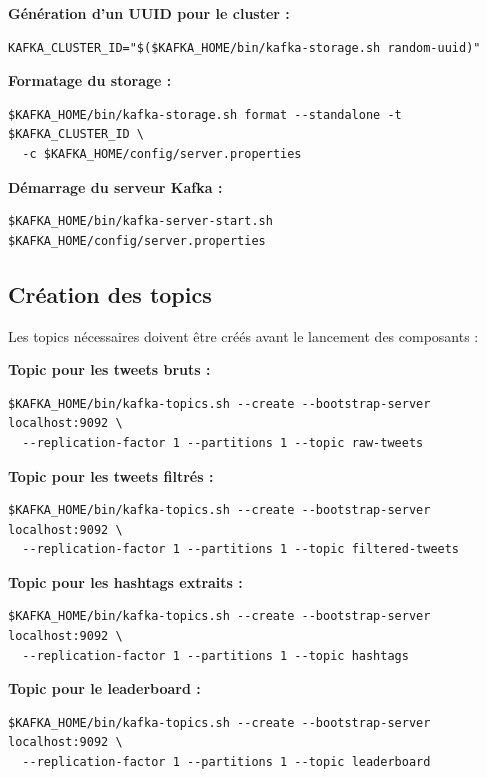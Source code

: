 \documentclass[10pt,a4paper]{article}
\begin{document}
\textbf{Génération d'un UUID pour le cluster :}

\begin{verbatim}
KAFKA_CLUSTER_ID="$($KAFKA_HOME/bin/kafka-storage.sh random-uuid)"
\end{verbatim}

\textbf{Formatage du storage :}

\begin{verbatim}
$KAFKA_HOME/bin/kafka-storage.sh format --standalone -t $KAFKA_CLUSTER_ID \
  -c $KAFKA_HOME/config/server.properties
\end{verbatim}

\textbf{Démarrage du serveur Kafka :}

\begin{verbatim}
$KAFKA_HOME/bin/kafka-server-start.sh $KAFKA_HOME/config/server.properties
\end{verbatim}

\subsection{Création des topics}

Les topics nécessaires doivent être créés avant le lancement des composants :

\textbf{Topic pour les tweets bruts :}

\begin{verbatim}
$KAFKA_HOME/bin/kafka-topics.sh --create --bootstrap-server localhost:9092 \
  --replication-factor 1 --partitions 1 --topic raw-tweets
\end{verbatim}

\textbf{Topic pour les tweets filtrés :}

\begin{verbatim}
$KAFKA_HOME/bin/kafka-topics.sh --create --bootstrap-server localhost:9092 \
  --replication-factor 1 --partitions 1 --topic filtered-tweets
\end{verbatim}

\textbf{Topic pour les hashtags extraits :}

\begin{verbatim}
$KAFKA_HOME/bin/kafka-topics.sh --create --bootstrap-server localhost:9092 \
  --replication-factor 1 --partitions 1 --topic hashtags
\end{verbatim}

\textbf{Topic pour le leaderboard :}

\begin{verbatim}
$KAFKA_HOME/bin/kafka-topics.sh --create --bootstrap-server localhost:9092 \
  --replication-factor 1 --partitions 1 --topic leaderboard
\end{verbatim}
\end{document}
